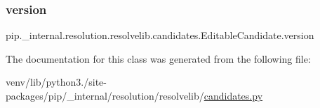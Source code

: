 \subsubsection{\texorpdfstring{version}{version}}
{\footnotesize\ttfamily pip.\+\_\+internal.\+resolution.\+resolvelib.\+candidates.\+Editable\+Candidate.\+version\hspace{0.3cm}{\ttfamily [static]}}



The documentation for this class was generated from the following file\+:\begin{DoxyCompactItemize}
\item 
venv/lib/python3./site-\/packages/pip/\+\_\+internal/resolution/resolvelib/\hyperlink{candidates_8py}{candidates.\+py}\end{DoxyCompactItemize}
